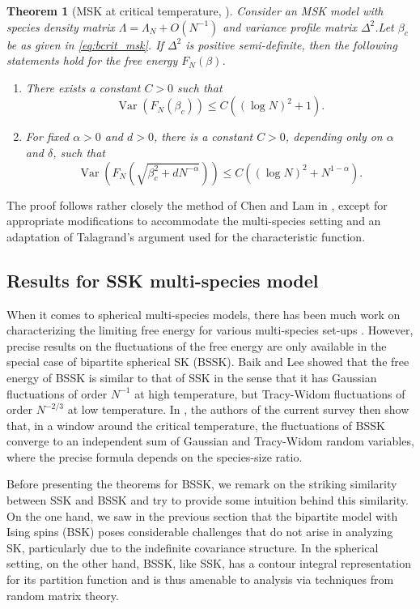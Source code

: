 \documentclass[11pt]{article}
\numberwithin{equation}{section}
\DeclareMathOperator{\Var}{Var}
\newcommand{\beq}{ \begin{equation} }
\newcommand{\eeq}{ \end{equation} }
\def \a {\alpha}
\def \b {\beta}
\def \d {\delta}
\newtheorem{theorem}{Theorem}[section]
\theoremstyle{remark}
\begin{document}
\begin{theorem}[MSK at critical temperature, \cite{CWL_variancebound}]\label{thm:main}
    Consider an MSK model with species density matrix $\Lambda=\Lambda_N+O(N^{-1})$ and variance profile matrix $\Delta^2$.Let $\b_c$ be as given in \eqref{eq:bcrit_msk}. If $\Delta^2$ is positive semi-definite, then the following statements hold for the free energy $F_N(\b)$.
    \begin{enumerate}
    \item There exists a constant $C>0$ such that 
    \beq
    	\Var\left(F_N(\b_c)\right) \leq C \left( (\log N)^2 +1\right).
    \eeq
    \item For fixed $\a>0$ and $d>0$, there is a constant $C>0$, depending only on $\a$ and $\d$, such that
    \beq
    	\Var\left(F_N(\sqrt{\b_c^2+dN^{-\a}})\right) \leq C \left( (\log N)^2 + N^{1-\a}\right).
    \eeq
    \end{enumerate}
\end{theorem}
The proof follows rather closely the method of Chen and Lam in \cite{ChenLam19}, except for appropriate modifications to accommodate the multi-species setting and an adaptation of Talagrand's argument used for the characteristic function.

\subsection{Results for SSK multi-species model}\label{subsec:msk_spherical}
When it comes to spherical multi-species models, there has been much work on characterizing the limiting free energy for various multi-species set-ups \cite{AuffingerChenBSSK,Subag23,BatesSohn22,batessohn25balanced}.  However, precise results on the fluctuations of the free energy are only available in the special case of bipartite spherical SK (BSSK).  Baik and Lee \cite{BL20} showed that the free energy of BSSK is similar to that of SSK in the sense that it has Gaussian fluctuations of order $N^{-1}$ at high temperature, but Tracy-Widom fluctuations of order $N^{-2/3}$ at low temperature. In \cite{CWL_BSSK}, the authors of the current survey then show that, in a window around the critical temperature, the fluctuations of BSSK converge to an independent sum of Gaussian and Tracy-Widom random variables, where the precise formula depends on the species-size ratio.

Before presenting the theorems for BSSK, we remark on the striking similarity between SSK and BSSK and try to provide some intuition behind this similarity.  On the one hand, we saw in the previous section that the bipartite model with Ising spins (BSK) poses considerable challenges that do not arise in analyzing SK, particularly due to the indefinite covariance structure.  In the spherical setting, on the other hand, BSSK, like SSK, has a contour integral representation for its partition function and is thus amenable to analysis via techniques from random matrix theory.  
\end{document}
